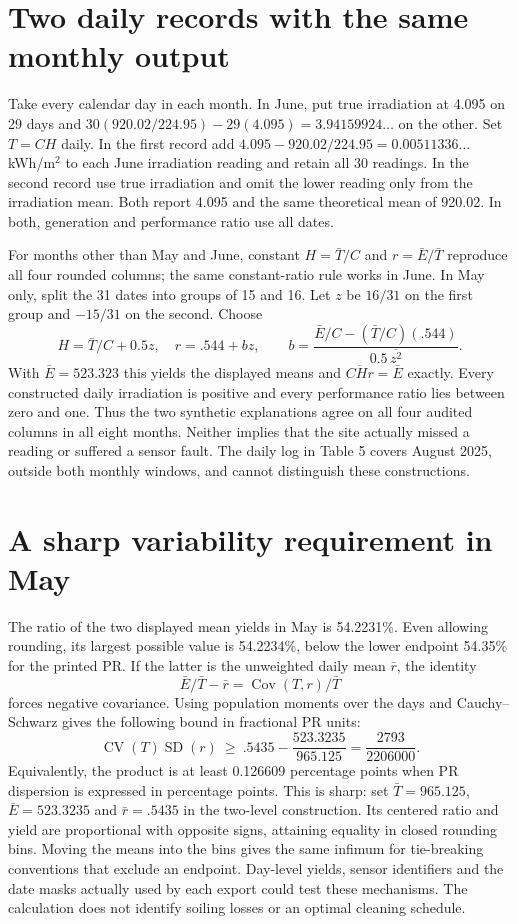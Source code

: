 \documentclass[10pt]{article}
\begin{document}
\section{Two daily records with the same monthly output}
Take every calendar day in each month. In June, put true irradiation at 4.095 on 29 days and $30(920.02/224.95)-29(4.095)=3.94159924\ldots$ on the other. Set $T=C H$ daily. In the first record add $4.095-920.02/224.95=0.00511336\ldots$ kWh/m$^2$ to each June irradiation reading and retain all 30 readings. In the second record use true irradiation and omit the lower reading only from the irradiation mean. Both report 4.095 and the same theoretical mean of 920.02. In both, generation and performance ratio use all dates.

For months other than May and June, constant $H=\bar T/C$ and $r=\bar E/\bar T$ reproduce all four rounded columns; the same constant-ratio rule works in June. In May only, split the 31 dates into groups of 15 and 16. Let $z$ be $16/31$ on the first group and $-15/31$ on the second. Choose
\[
 H=\bar T/C+0.5z,\quad r=.544+bz,\qquad
 b=\frac{\bar E/C-(\bar T/C)(.544)}{0.5\,\overline{z^2}} .
\]
With $\bar E=523.323$ this yields the displayed means and $\overline{C H r}=\bar E$ exactly. Every constructed daily irradiation is positive and every performance ratio lies between zero and one. Thus the two synthetic explanations agree on all four audited columns in all eight months. Neither implies that the site actually missed a reading or suffered a sensor fault. The daily log in Table 5 covers August 2025, outside both monthly windows, and cannot distinguish these constructions.

\section{A sharp variability requirement in May}
The ratio of the two displayed mean yields in May is 54.2231\%. Even allowing rounding, its largest possible value is 54.2234\%, below the lower endpoint 54.35\% for the printed PR. If the latter is the unweighted daily mean $\bar r$, the identity
\[
 \bar E/\bar T-\bar r=\operatorname{Cov}(T,r)/\bar T
\]
forces negative covariance. Using population moments over the days and Cauchy--Schwarz gives the following bound in fractional PR units:
\[
 \operatorname{CV}(T)\operatorname{SD}(r)\ \geq\
 .5435-\frac{523.3235}{965.125}=\frac{2793}{2206000}.
\]
Equivalently, the product is at least 0.126609 percentage points when PR dispersion is expressed in percentage points. This is sharp: set $\bar T=965.125$, $\bar E=523.3235$ and $\bar r=.5435$ in the two-level construction. Its centered ratio and yield are proportional with opposite signs, attaining equality in closed rounding bins. Moving the means into the bins gives the same infimum for tie-breaking conventions that exclude an endpoint. Day-level yields, sensor identifiers and the date masks actually used by each export could test these mechanisms. The calculation does not identify soiling losses or an optimal cleaning schedule.
\end{document}
